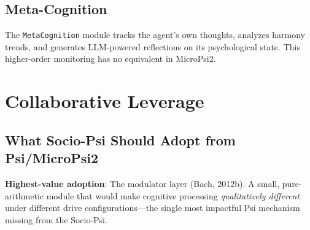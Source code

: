 \documentclass[11pt,letterpaper]{article}
\begin{document}
\subsection{Meta-Cognition}

The \texttt{MetaCognition} module tracks the agent's own thoughts, analyzes
harmony trends, and generates LLM-powered reflections on its psychological
state. This higher-order monitoring has no equivalent in MicroPsi2.

\section{Collaborative Leverage}
\label{sec:leverage}

\subsection{What Socio-Psi Should Adopt from Psi/MicroPsi2}

\begin{opportunitybox}
\textbf{Highest-value adoption}: The modulator layer (Bach, 2012b). A
small, pure-arithmetic module that would make cognitive processing
\emph{qualitatively different} under different drive configurations---the
single most impactful Psi mechanism missing from the Socio-Psi.
\end{opportunitybox}
\end{document}
